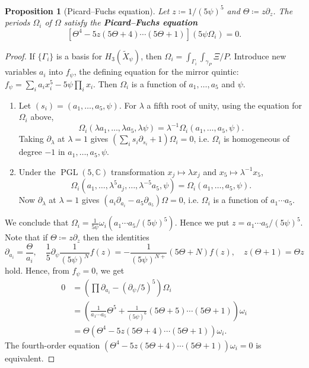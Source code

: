 \documentclass{report}
\theoremstyle{plain}
\newtheorem{proposition}[theorem]{Proposition}
\theoremstyle{definition}
\theoremstyle{remark}
\newcommand{\di}{\partial}
\newcommand{\bC}{\mathbb{C}}
\DeclareMathOperator{\PGL}{PGL}
\begin{document}
\begin{proposition}[Picard--Fuchs equation]
  Let $z \coloneqq 1/(5\psi)^5$ and $\Theta \coloneqq z\di_z$. The
  periods $\Omega_i$ of $\Omega$ satisfy the {\bf Picard--Fuchs
    equation}
  \[ [\Theta^4 - 5z(5\Theta+4)\cdots(5\Theta+1)](5\psi\Omega_i) = 0. \]
\end{proposition}

\begin{proof}
  If $\{\Gamma_i\}$ is a basis for $H_3(\tilde{X}_\psi)$, then
  $\Omega_i = \int_{\Gamma_i} \int_{\gamma_P} \Xi/P$. Introduce new
  variables $a_i$ into $f_\psi$, the defining equation for the mirror
  quintic: $f_\psi = \sum_i a_i x_i^5 - 5\psi \prod_i x_i$. Then
  $\Omega_i$ is a function of $a_1, \ldots, a_5$ and $\psi$.
  \begin{enumerate}
  \item Let $(s_i) = (a_1, \ldots, a_5, \psi)$. For $\lambda$ a fifth
    root of unity, using the equation for $\Omega_i$ above,
    \[ \Omega_i(\lambda a_1, \ldots, \lambda a_5, \lambda \psi) = \lambda^{-1}\Omega_i(a_1, \ldots, a_5, \psi). \]
    Taking $\di_\lambda$ at $\lambda = 1$ gives $(\sum_i s_i \di_{s_i}
    + 1)\Omega_i = 0$, i.e. $\Omega_i$ is homogeneous of degree $-1$
    in $a_1, \ldots, a_5, \psi$.
  \item Under the $\PGL(5, \bC)$ transformation $x_j \mapsto \lambda
    x_j$ and $x_5 \mapsto \lambda^{-1}x_5$,
    \[ \Omega_i(a_1, \ldots, \lambda^5a_j, \ldots, \lambda^{-5}a_5, \psi) = \Omega_i(a_1, \ldots, a_5, \psi). \]
    Now $\di_\lambda$ at $\lambda = 1$ gives $(a_i \di_{a_i} - a_5
    \di_{a_5})\Omega = 0$, i.e. $\Omega_i$ is a function of $a_1
    \cdots a_5$.
  \end{enumerate}
  We conclude that $\Omega_i = \frac{1}{5\psi} \omega_i(a_1\cdots
  a_5/(5\psi)^5)$. Hence we put $z = a_1\cdots a_5/(5\psi)^5$. Note
  that if $\Theta \coloneqq z\di_z$ then the identities
  \[ \di_{a_i} = \frac{\Theta}{a_i}, \quad \frac{1}{5}\di_\psi \frac{1}{(5\psi)^N} f(z) = -\frac{1}{(5\psi)^{N+}} (5\Theta + N) f(z), \quad z(\Theta+1) = \Theta z \]
  hold. Hence, from $f_\psi = 0$, we get
  \begin{align*}
    0
    &= \left(\prod \di_{a_i} - (\di_\psi/5)^5\right) \Omega_i \\
    &= \left(\frac{1}{a_1 \cdots a_5} \Theta^5 + \frac{1}{(5\psi)^6}(5\Theta+5) \cdots (5\Theta+1)\right) \omega_i \\
    &= \Theta(\Theta^4 - 5z(5\Theta+4)\cdots (5\Theta+1)) \omega_i.
  \end{align*}
  The fourth-order equation $(\Theta^4 - 5z(5\Theta+4)\cdots
  (5\Theta+1)) \omega_i = 0$ is equivalent.
\end{proof}
\end{document}
